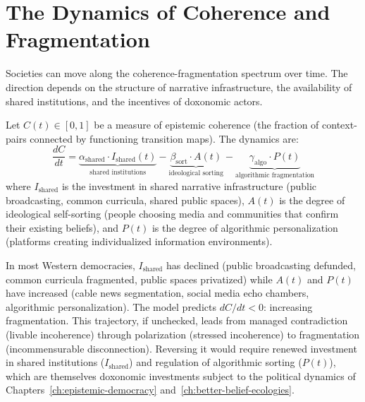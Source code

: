 \section{The Dynamics of Coherence and Fragmentation}
\label{sec:ch12-dynamics}

Societies can move along the coherence-fragmentation spectrum over time.
The direction depends on the structure of narrative infrastructure, the availability of shared institutions, and the incentives of doxonomic actors.

\begin{model}
\label{mod:coherence-dynamics}
Let $C(t) \in [0,1]$ be a measure of epistemic coherence (the fraction of context-pairs connected by functioning transition maps).
The dynamics are:
\begin{equation}
\label{eq:coherence}
  \frac{dC}{dt} = \underbrace{\alpha_{\text{shared}} \cdot I_{\text{shared}}(t)}_{\text{shared institutions}} - \underbrace{\beta_{\text{sort}} \cdot A(t)}_{\text{ideological sorting}} - \underbrace{\gamma_{\text{algo}} \cdot P(t)}_{\text{algorithmic fragmentation}}
\end{equation}
where $I_{\text{shared}}$ is the investment in shared narrative infrastructure (public broadcasting, common curricula, shared public spaces), $A(t)$ is the degree of ideological self-sorting (people choosing media and communities that confirm their existing beliefs), and $P(t)$ is the degree of algorithmic personalization (platforms creating individualized information environments).
\end{model}

\begin{remark}
\label{rem:fragmentation-trend}
In most Western democracies, $I_{\text{shared}}$ has declined (public broadcasting defunded, common curricula fragmented, public spaces privatized) while $A(t)$ and $P(t)$ have increased (cable news segmentation, social media echo chambers, algorithmic personalization).
The model predicts $dC/dt < 0$: increasing fragmentation.
This trajectory, if unchecked, leads from managed contradiction (livable incoherence) through polarization (stressed incoherence) to fragmentation (incommensurable disconnection).
Reversing it would require renewed investment in shared institutions ($I_{\text{shared}}$) and regulation of algorithmic sorting ($P(t)$), which are themselves doxonomic investments subject to the political dynamics of Chapters~\ref{ch:epistemic-democracy} and~\ref{ch:better-belief-ecologies}.
\end{remark}


